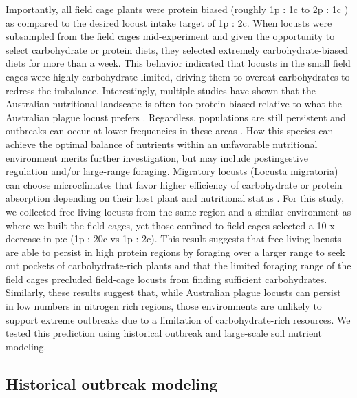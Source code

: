 \documentclass[
]{article}
\begin{document}
Importantly, all field cage plants were protein biased (roughly 1p : 1c
to 2p : 1c ) as compared to the desired locust intake target of 1p : 2c.
When locusts were subsampled from the field cages mid-experiment and
given the opportunity to select carbohydrate or protein diets, they
selected extremely carbohydrate-biased diets for more than a week. This
behavior indicated that locusts in the small field cages were highly
carbohydrate-limited, driving them to overeat carbohydrates to redress
the imbalance. Interestingly, multiple studies have shown that the
Australian nutritional landscape is often too protein-biased relative to
what the Australian plague locust prefers
\citep{lawton_woody_2020, lawton_mismatched_2021}. Regardless,
populations are still persistent and outbreaks can occur at lower
frequencies in these areas
\citep{deveson_satellite_2013, key_general_1945}. How this species can
achieve the optimal balance of nutrients within an unfavorable
nutritional environment merits further investigation, but may include
postingestive regulation and/or large-range foraging. Migratory locusts
(Locusta migratoria) can choose microclimates that favor higher
efficiency of carbohydrate or protein absorption depending on their host
plant and nutritional status \citep{clissold_insect_2013}. For this
study, we collected free-living locusts from the same region and a
similar environment as where we built the field cages, yet those
confined to field cages selected a 10 x decrease in p:c (1p : 20c vs 1p
: 2c). This result suggests that free-living locusts are able to persist
in high protein regions by foraging over a larger range to seek out
pockets of carbohydrate-rich plants and that the limited foraging range
of the field cages precluded field-cage locusts from finding sufficient
carbohydrates. Similarly, these results suggest that, while Australian
plague locusts can persist in low numbers in nitrogen rich regions,
those environments are unlikely to support extreme outbreaks due to a
limitation of carbohydrate-rich resources. We tested this prediction
using historical outbreak and large-scale soil nutrient modeling.

\subsection{Historical outbreak
modeling}\label{historical-outbreak-modeling}
\end{document}
